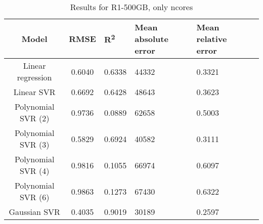 \begin{table}[H]
\centering
\begin{adjustbox}{center}
\begin{tabular}{c | c M{1.2cm} M{2.5cm} M{2.5cm} M{1.8cm}}
Model & RMSE & R\textsuperscript{2} & Mean absolute error & Mean relative error \tabularnewline
\hline
Linear regression & 0.6040 & 0.6338 &  44332 & 0.3321 \\
Linear SVR & 0.6692 & 0.6428 &  48643 & 0.3623 \\
Polynomial SVR (2) & 0.9736 & 0.0889 &  62658 & 0.5003 \\
Polynomial SVR (3) & 0.5829 & 0.6924 &  40582 & 0.3111 \\
Polynomial SVR (4) & 0.9816 & 0.1055 &  66974 & 0.6097 \\
Polynomial SVR (6) & 0.9863 & 0.1273 &  67430 & 0.6322 \\
Gaussian SVR & 0.4035 & 0.9019 &  30189 & 0.2597 \\
\end{tabular}
\end{adjustbox}
\\
\caption{Results for R1-500GB, only ncores}
\label{tab:only_1_linear_R1_500}
\end{table}
